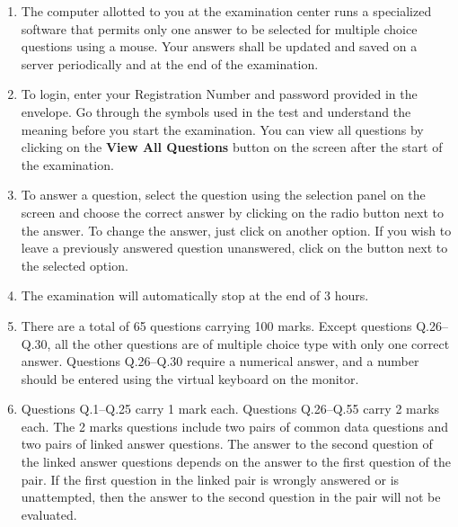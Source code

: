 \documentclass[journal]{IEEEtran}
\begin{document}
\vspace{0.5em}
\begin{enumerate}[leftmargin=0pt]
\begin{center}
    {\Large \textbf{Duration: Three Hours \hfill Maximum Marks: 100}} \\
\end{center}
\noindent\textbf{\textit{Read the following instructions carefully.}}
   \item The computer allotted to you at the examination center runs a specialized software that permits only one answer to be selected for multiple choice questions using a mouse. Your answers shall be updated and saved on a server periodically and at the end of the examination.
    
    \item To login, enter your Registration Number and password provided in the envelope. Go through the symbols used in the test and understand the meaning before you start the examination. You can view all questions by clicking on the \textbf{View All Questions} button on the screen after the start of the examination.
    
    \item To answer a question, select the question using the selection panel on the screen and choose the correct answer by clicking on the radio button next to the answer. To change the answer, just click on another option. If you wish to leave a previously answered question unanswered, click on the button next to the selected option.
    
    \item The examination will automatically stop at the end of 3 hours.
    
    \item There are a total of 65 questions carrying 100 marks. Except questions Q.26–Q.30, all the other questions are of multiple choice type with only one correct answer. Questions Q.26–Q.30 require a numerical answer, and a number should be entered using the virtual keyboard on the monitor.
    
    \item Questions Q.1–Q.25 carry 1 mark each. Questions Q.26–Q.55 carry 2 marks each. The 2 marks questions include two pairs of common data questions and two pairs of linked answer questions. The answer to the second question of the linked answer questions depends on the answer to the first question of the pair. If the first question in the linked pair is wrongly answered or is unattempted, then the answer to the second question in the pair will not be evaluated.
    

\end{enumerate}
\end{document}

